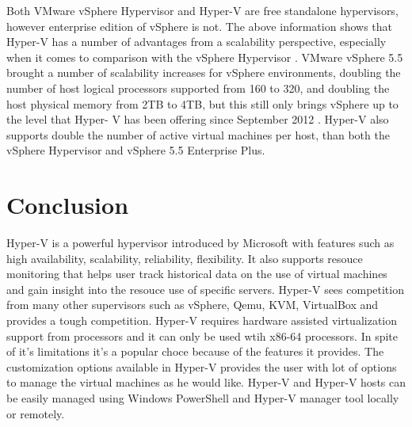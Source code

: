 \documentclass[9pt,twocolumn,twoside]{../../styles/osajnl}
\begin{document}
Both VMware vSphere Hypervisor and Hyper-V are free standalone
hypervisors, however enterprise edition of vSphere is not. The above
information shows that Hyper-V has a number of advantages from a
scalability perspective, especially when it comes to comparison with
the vSphere Hypervisor \cite{www-hyperv-paper}. VMware vSphere 5.5
brought a number of scalability increases for vSphere environments,
doubling the number of host logical processors supported from 160 to
320, and doubling the host physical memory from 2TB to 4TB, but this
still only brings vSphere up to the level that Hyper- V has been
offering since September 2012 \cite{www-hyperv-paper}. Hyper-V also
supports double the number of active virtual machines per host, than
both the vSphere Hypervisor and vSphere 5.5 Enterprise Plus.


\section{Conclusion}

Hyper-V is a powerful hypervisor introduced by Microsoft with features
such as high availability, scalability, reliability, flexibility. It
also supports resouce monitoring that helps user track historical data
on the use of virtual machines and gain insight into the resouce use
of specific servers. Hyper-V sees competition from many other
supervisors such as vSphere, Qemu, KVM, VirtualBox and provides a
tough competition. Hyper-V requires hardware assisted virtualization
support from processors and it can only be used wtih x86-64
processors. In spite of it's limitations it's a popular choce because
of the features it provides. The customization options available in
Hyper-V provides the user with lot of options to manage the virtual
machines as he would like. Hyper-V and Hyper-V hosts can be easily
managed using Windows PowerShell and Hyper-V manager tool locally or
remotely.



\end{document}
